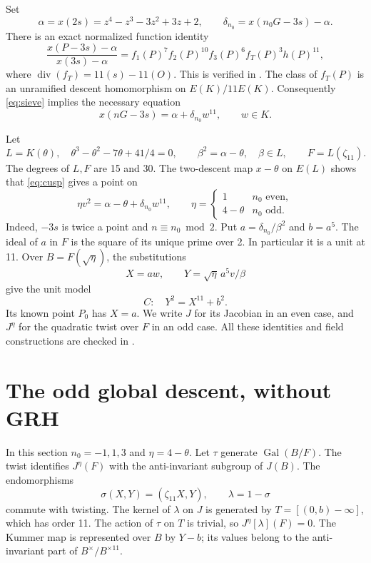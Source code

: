 \documentclass[11pt]{article}
\begin{document}
Set
\[
 \alpha=x(2s)=z^4-z^3-3z^2+3z+2,\qquad
 \delta_{n_0}=x(n_0G-3s)-\alpha.
\]
There is an exact normalized function identity
\[
 \frac{x(P-3s)-\alpha}{x(3s)-\alpha}
   = f_1(P)^7 f_2(P)^{10} f_3(P)^6 f_T(P)^3 h(P)^{11},
\]
where \(\operatorname{div}(f_T)=11(s)-11(O)\). This is verified in
. The class of \(f_T(P)\) is an
unramified descent homomorphism on \(E(K)/11E(K)\).
Consequently \eqref{eq:sieve} implies the necessary equation
\begin{equation}\label{eq:cusp}
 x(nG-3s)=\alpha+\delta_{n_0}w^{11},\qquad w\in K.
\end{equation}

Let
\[
 L=K(\theta),\quad \theta^3-\theta^2-7\theta+41/4=0,
 \qquad \beta^2=\alpha-\theta,\quad \beta\in L,
 \qquad F=L(\zeta_{11}).
\]
The degrees of \(L,F\) are 15 and 30. The two-descent map \(x-\theta\)
on \(E(L)\) shows that \eqref{eq:cusp} gives a point on
\begin{equation}\label{eq:genus5}
 \eta v^2=\alpha-\theta+\delta_{n_0}w^{11},\qquad
 \eta=\begin{cases}1&n_0\text{ even},\\4-\theta&n_0\text{ odd}.
 \end{cases}
\end{equation}
Indeed, \(-3s\) is twice a point and \(n\equiv n_0\bmod2\).
Put \(a=\delta_{n_0}/\beta^2\) and \(b=a^5\). The ideal of \(a\)
in \(F\) is the square of its unique prime over 2. In particular it
is a unit at 11. Over \(B=F(\sqrt\eta)\), the substitutions
\[
 X=aw,\qquad Y=\sqrt\eta\,a^5v/\beta
\]
give the unit model
\begin{equation}\label{eq:unit}
 C:\quad Y^2=X^{11}+b^2.
\end{equation}
Its known point \(P_0\) has \(X=a\). We write \(J\) for its Jacobian
in an even case, and \(J^\eta\) for the quadratic twist over \(F\) in
an odd case. All these identities and field constructions are checked in
.

\section{The odd global descent, without GRH}
In this section \(n_0=-1,1,3\) and \(\eta=4-\theta\). Let
\(\tau\) generate \(\operatorname{Gal}(B/F)\). The twist identifies
\(J^\eta(F)\) with the anti-invariant subgroup of \(J(B)\).
The endomorphisms
\[
 \sigma(X,Y)=(\zeta_{11}X,Y),\qquad \lambda=1-\sigma
\]
commute with twisting. The kernel of \(\lambda\) on \(J\) is generated
by \(T=[(0,b)-\infty]\), which has order 11. The action of \(\tau\)
on \(T\) is trivial, so \(J^\eta[\lambda](F)=0\).
The Kummer map is represented over \(B\) by \(Y-b\); its values belong
to the anti-invariant part of \(B^\times/B^{\times11}\).
\end{document}
